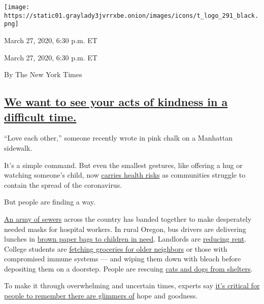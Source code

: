 \texttt{[image: https://static01.graylady3jvrrxbe.onion/images/icons/t\_logo\_291\_black.png]}

March 27, 2020, 6:30 p.m. ET

March 27, 2020, 6:30 p.m. ET

By The New York Times

\hypertarget{we-want-to-see-your-acts-of-kindness-in-a-difficult-time}{%
\subsection{\texorpdfstring{\protect\hyperlink{we-want-to-see-your-acts-of-kindness-in-a-difficult-time}{We
want to see your acts of kindness in a difficult
time.}}{We want to see your acts of kindness in a difficult time.}}\label{we-want-to-see-your-acts-of-kindness-in-a-difficult-time}}

``Love each other,'' someone recently wrote in pink chalk on a Manhattan
sidewalk.

It's a simple command. But even the smallest gestures, like offering a
hug or watching someone's child, now
\href{https://www.nytimes3xbfgragh.onion/2020/03/24/nyregion/ny-coronavirus-help.html}{carries
health risks} as communities struggle to contain the spread of the
coronavirus.

But people are finding a way.

\href{https://www.nytimes3xbfgragh.onion/2020/03/25/business/coronavirus-masks-sewers.html}{An
army of sewers} across the country has banded together to make
desperately needed masks for hospital workers. In rural Oregon, bus
drivers are delivering lunches in
\href{https://time.com/5808475/coronavirus-school-lunches-bus-drivers/}{brown
paper bags to children in need}. Landlords are
\href{https://nypost.com/2020/03/22/milwaukee-landlord-slashes-rent-to-100-amid-coronavirus-outbreak/}{reducing
rent}. College students are
\href{https://www.nytimes3xbfgragh.onion/2020/03/24/nyregion/ny-coronavirus-help.html}{fetching
groceries for older neighbors} or those with compromised immune systems
--- and wiping them down with bleach before depositing them on a
doorstep. People are rescuing
\href{https://www.nytimes3xbfgragh.onion/2020/03/19/us/coronavirus-foster-pets.html}{cats
and dogs from shelters}.

To make it through overwhelming and uncertain times, experts say
\href{https://www.nytimes3xbfgragh.onion/2020/03/27/us/coronavirus-good-news-kindness.html}{it's
critical for people to remember there are glimmers of} hope and
goodness.

